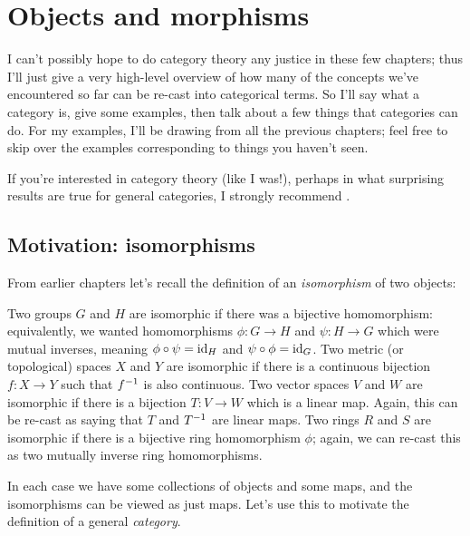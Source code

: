 \chapter{Objects and morphisms}
\label{ch:cats}
I can't possibly hope to do category theory any justice in these few chapters;
thus I'll just give a very high-level overview of how many of the concepts we've
encountered so far can be re-cast into categorical terms.
So I'll say what a category is, give some examples,
then talk about a few things that categories can do.
For my examples, I'll be drawing from all the previous chapters;
feel free to skip over the examples corresponding to things you haven't seen.

If you're interested in category theory (like I was!), perhaps in
what surprising results are true for general categories, I strongly recommend \cite{ref:msci}.

\section{Motivation: isomorphisms}
From earlier chapters let's recall the definition of an \emph{isomorphism} of two objects:
\begin{itemize}
	\ii Two groups $G$ and $H$ are isomorphic if there was a bijective homomorphism:
	equivalently, we wanted homomorphisms $\phi : G \to H$ and $\psi : H \to G$
	which were mutual inverses, meaning $\phi \circ \psi = \mathrm{id}_H$ and $\psi \circ \phi = \mathrm{id}_G$.
	\ii Two metric (or topological) spaces $X$ and $Y$ are isomorphic
	if there is a continuous bijection $f : X \to Y$ such that $f^{-1}$ is also continuous.
	\ii Two vector spaces $V$ and $W$ are isomorphic if there is a bijection $T : V \to W$
	which is a linear map.
	Again, this can be re-cast as saying that $T$ and $T^{-1}$ are linear maps.
	\ii Two rings $R$ and $S$ are isomorphic if there is a bijective ring homomorphism $\phi$;
	again, we can re-cast this as two mutually inverse ring homomorphisms.
\end{itemize}

In each case we have some collections of objects and some maps,
and the isomorphisms can be viewed as just maps.
Let's use this to motivate the definition of a general \emph{category}.

